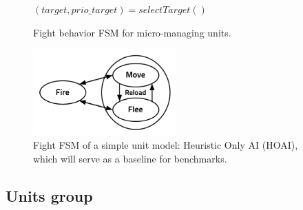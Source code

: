 \begin{figure}[h]
\begin{algorithmic}
\Else
\EndIf
\EndFunction

\State $(target, prio\_target) = selectTarget()$
    \Else
    \EndIf
\Else
\EndIf
\EndFunction
\end{algorithmic}
\caption{Fight behavior FSM for micro-managing units.}
\label{alg:fight_FSM}
\end{figure}

\begin{figure}[h]
\begin{center}
\includegraphics[width=5.5cm]{images/simple_unit_fight_FSM.pdf}
\end{center}
\caption{Fight FSM of a simple unit model: Heuristic Only AI (HOAI), which will serve as a baseline for benchmarks.}
\label{fig:fight_FSM}
\end{figure}


\subsection{Units group}

